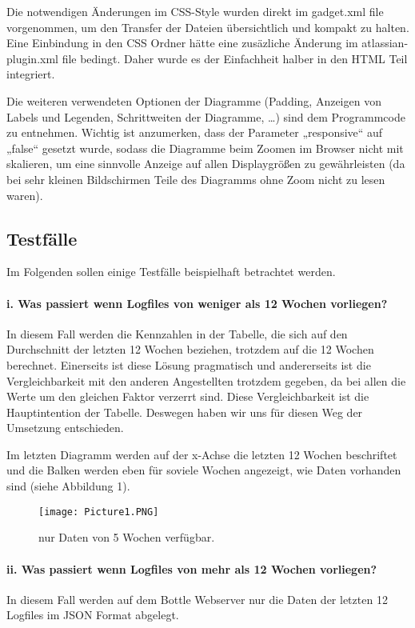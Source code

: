 \documentclass[a4paper,12pt,]{article}
\begin{document}
Die notwendigen Änderungen im CSS-Style wurden direkt im gadget.xml file vorgenommen, um den Transfer der Dateien übersichtlich und kompakt zu halten. Eine Einbindung in den CSS Ordner hätte eine zusäzliche Änderung im atlassian-plugin.xml file bedingt. Daher wurde es der Einfachheit halber in den HTML Teil integriert.


Die weiteren verwendeten Optionen der Diagramme (Padding, Anzeigen von Labels und Legenden, Schrittweiten der Diagramme, …) sind dem Programmcode zu entnehmen.
Wichtig ist anzumerken, dass der Parameter „responsive“ auf „false“ gesetzt wurde, sodass die Diagramme beim Zoomen im Browser nicht mit skalieren, um eine sinnvolle Anzeige auf allen Displaygrößen zu gewährleisten (da bei sehr kleinen Bildschirmen Teile des Diagramms ohne Zoom nicht zu lesen waren).

\subsection{Testfälle}
Im Folgenden sollen einige Testfälle beispielhaft betrachtet werden.
\paragraph{i. Was passiert wenn Logfiles von weniger als 12 Wochen vorliegen?}
In diesem Fall werden die Kennzahlen in der Tabelle, die sich auf den Durchschnitt der letzten 12 Wochen beziehen, trotzdem auf die 12 Wochen berechnet. Einerseits ist diese Lösung pragmatisch und andererseits ist die Vergleichbarkeit mit den anderen Angestellten trotzdem gegeben, da bei allen die Werte um den gleichen Faktor verzerrt sind. Diese Vergleichbarkeit ist die Hauptintention der Tabelle. Deswegen haben wir uns für diesen Weg der Umsetzung entschieden.

Im letzten Diagramm werden auf der x-Achse die letzten 12 Wochen beschriftet und die Balken werden eben für soviele Wochen angezeigt, wie Daten vorhanden sind (siehe Abbildung 1).

\begin{figure}[htb]
\centering
\texttt{[image: Picture1.PNG]}
\caption{nur Daten von 5 Wochen verfügbar.}
\end{figure}

\paragraph{ii. Was passiert wenn Logfiles von mehr als 12 Wochen vorliegen?}
In diesem Fall werden auf dem Bottle Webserver nur die Daten der letzten 12 Logfiles im JSON Format abgelegt.
\end{document}
